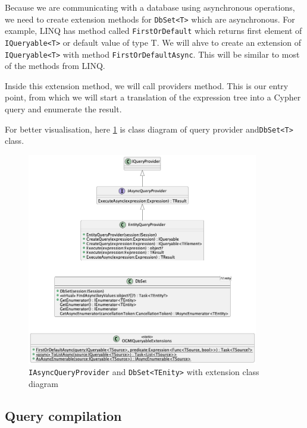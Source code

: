 Because we are communicating with a database using asynchronous operations, we need to create extension methods for \texttt{DbSet<T>} which are asynchronous.
For example, LINQ has method called \texttt{FirstOrDefault} which returns first element of \texttt{IQueryable<T>} or default value of type T.
We will ahve to create an extension of \texttt{IQueryable<T>} with method \texttt{FirstOrDefaultAsync}.
This will be similar to most of the methods from LINQ.

Inside this extension method, we will call providers\linebreak{} method.
This is our entry point, from which we will start a translation of the expression tree into a Cypher query and enumerate the result.

For better visualisation, here \ref{fig:queryprovider} is class diagram of query provider and\linebreak\texttt{DbSet<T>} class.

\begin{figure}[H]
	\centering
	\includegraphics[width=0.9\textwidth]{content/QueryProvider.png}
	\caption{\texttt{IAsyncQueryProvider} and \texttt{DbSet<TEnity>} with extension class diagram}
	\label{fig:queryprovider}
\end{figure}

\subsection{Query compilation}

